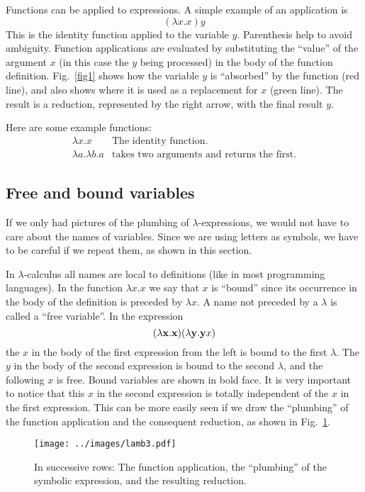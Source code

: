 Functions can be applied to expressions. A simple example of an application is 
$$(\lambda x.x)y$$
This is the identity function applied to the variable $y$. Parenthesis help to avoid ambiguity. Function applications are evaluated by substituting the ``value'' of the argument $x$ (in this case the $y$ being processed) in the body of the function definition. Fig.~\ref{fig1} shows how the variable $y$ is ``absorbed'' by the function (red line), and also shows where it is used as a replacement for $x$ (green line). The result is a reduction, represented by the right arrow, with the final result $y$.


Here are some example functions:
\[
\begin{array}{ll}
\lambda x.x  & \text{The identity function.}\\
\lambda a.\lambda b.a & \text{takes two arguments and returns the first.}
\end{array}
\]
\subsection{Free and bound variables}

If we only had pictures of the plumbing of $\lambda$-expressions, we would not have to care about the names of variables. Since we are using letters as symbols, we have to be careful if we repeat them, as shown in this section.

In $\lambda$-calculus all names are local to definitions (like in most programming languages). In the function $\lambda x.x$ we say that $x$ is ``bound'' since its occurrence in the body of the definition is preceded by $\lambda x$. A name not preceded by a $\lambda$ is called a ``free variable''. In the expression 
$$(\lambda {\bf x}.{\bf x})(\lambda{\bf y}.{\bf y}x)$$ 
the $x$ in the body of the first expression from the left is bound to the first $\lambda$. The $y$ in the body of the second expression is bound to the second $\lambda$, and the following $x$ is free. Bound variables are shown in bold face.  It is very important to notice that this $x$ in the second expression is totally independent of the $x$ in the first expression. This can be more easily seen if we draw the ``plumbing'' of the function application and the consequent reduction, as shown in Fig.~\ref{fig2}.

\begin{figure}[htb]
\centerline{\texttt{[image: ../images/lamb3.pdf]}}
\caption{In successive rows: The function application, the ``plumbing'' of the symbolic expression, and the resulting reduction.\label{fig2}}
\end{figure} 

